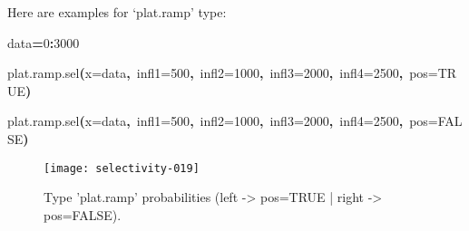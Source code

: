 \documentclass[letterpaper, 12pt]{article}
\newenvironment{Hinput}%
{}%
{}%
\newenvironment{Hchunk}%
{\vspace{0.5em}\par\begin{flushleft}}%
{\end{flushleft}}%
\newcommand{\hlnumber}[1]{\textcolor[rgb]{0.0823529411764706,0.0784313725490196,0.709803921568627}{#1}}%
\newcommand{\hlfunctioncall}[1]{\textcolor[rgb]{1,0,0}{#1}}%
\newcommand{\hlkeyword}[1]{\textcolor[rgb]{0,0,0}{\textbf{#1}}}%
\newcommand{\hlargument}[1]{\textcolor[rgb]{0.694117647058824,0.247058823529412,0.0196078431372549}{#1}}%
\newcommand{\hlassignement}[1]{\textcolor[rgb]{0.215686274509804,0.215686274509804,0.384313725490196}{\textbf{#1}}}%
\newcommand{\hlsymbol}[1]{\textcolor[rgb]{0,0,0}{#1}}%
\newcommand{\hlprompt}[1]{\textcolor[rgb]{0,0,0}{#1}}%
\begin{document}
\newpage

Here are examples for `plat.ramp' type:
\begin{Hchunk}
\begin{normalsize}
\begin{Hinput}
\ttfamily\noindent
\hlprompt{\usebox{\hlnormalsizeboxgreaterthan}{\ }}\hlsymbol{data}\hlassignement{=}\hlnumber{0}\hlkeyword{:}\hlnumber{3000}\mbox{}
\normalfont
\end{Hinput}


\begin{Hinput}
\ttfamily\noindent
\hlprompt{\usebox{\hlnormalsizeboxgreaterthan}{\ }}\hlfunctioncall{plat.ramp.sel}\hlkeyword{(}\hlargument{x}\hlargument{=}\hlsymbol{data}\hlkeyword{,}{\ }\hlargument{infl1}\hlargument{=}\hlnumber{500}\hlkeyword{,}{\ }\hlargument{infl2}\hlargument{=}\hlnumber{1000}\hlkeyword{,}{\ }\hlargument{infl3}\hlargument{=}\hlnumber{2000}\hlkeyword{,}{\ }\hlargument{infl4}\hlargument{=}\hlnumber{2500}\hlkeyword{,}{\ }\hlargument{pos}\hlargument{=}\hlnumber{TRUE}\hlkeyword{)}\mbox{}
\normalfont
\end{Hinput}


\begin{Hinput}
\ttfamily\noindent
\hlprompt{\usebox{\hlnormalsizeboxgreaterthan}{\ }}\hlfunctioncall{plat.ramp.sel}\hlkeyword{(}\hlargument{x}\hlargument{=}\hlsymbol{data}\hlkeyword{,}{\ }\hlargument{infl1}\hlargument{=}\hlnumber{500}\hlkeyword{,}{\ }\hlargument{infl2}\hlargument{=}\hlnumber{1000}\hlkeyword{,}{\ }\hlargument{infl3}\hlargument{=}\hlnumber{2000}\hlkeyword{,}{\ }\hlargument{infl4}\hlargument{=}\hlnumber{2500}\hlkeyword{,}{\ }\hlargument{pos}\hlargument{=}\hlnumber{FALSE}\hlkeyword{)}\mbox{}
\normalfont
\end{Hinput}


\end{normalsize}
\end{Hchunk}

\begin{figure}[h]
\vspace{-20pt}
\begin{center}
\texttt{[image: selectivity-019]}
\end{center}
\vspace{-30pt}
\caption{Type 'plat.ramp' probabilities (left -> pos=TRUE |  right -> pos=FALSE).}
\vspace{-10pt}
\label{fig9}
\end{figure}
\end{document}
